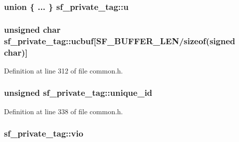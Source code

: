 \subsubsection[{\texorpdfstring{u}{u}}]{\setlength{\rightskip}{0pt plus 5cm}union \{ ... \}   sf\+\_\+private\+\_\+tag\+::u}\hypertarget{structsf__private__tag_a5265ad37facae07390bb4b9e89b2499b}{}\label{structsf__private__tag_a5265ad37facae07390bb4b9e89b2499b}
\subsubsection[{\texorpdfstring{ucbuf}{ucbuf}}]{\setlength{\rightskip}{0pt plus 5cm}unsigned char sf\+\_\+private\+\_\+tag\+::ucbuf\mbox{[}{\bf S\+F\+\_\+\+B\+U\+F\+F\+E\+R\+\_\+\+L\+EN}/sizeof(signed char)\mbox{]}}\hypertarget{structsf__private__tag_a44b6331e9e662d9fc092f7c6c4ab6d1f}{}\label{structsf__private__tag_a44b6331e9e662d9fc092f7c6c4ab6d1f}


Definition at line 312 of file common.\+h.

\subsubsection[{\texorpdfstring{unique\+\_\+id}{unique_id}}]{\setlength{\rightskip}{0pt plus 5cm}unsigned sf\+\_\+private\+\_\+tag\+::unique\+\_\+id}\hypertarget{structsf__private__tag_a28082288cf3d352df6db48cf98e84d61}{}\label{structsf__private__tag_a28082288cf3d352df6db48cf98e84d61}


Definition at line 338 of file common.\+h.

\subsubsection[{\texorpdfstring{vio}{vio}}]{ sf\+\_\+private\+\_\+tag\+::vio}\hypertarget{structsf__private__tag_a6de4eff0a4fa2a9b06de7ade18c66297}{}\label{structsf__private__tag_a6de4eff0a4fa2a9b06de7ade18c66297}


